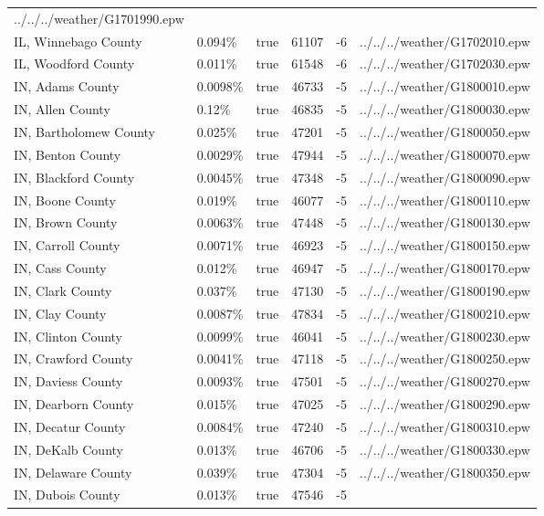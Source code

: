 \begin{longtable}[]{@{}llllll@{}}
../../../weather/G1701990.epw \\
IL, Winnebago County & 0.094\% & true & 61107 & -6 &
../../../weather/G1702010.epw \\
IL, Woodford County & 0.011\% & true & 61548 & -6 &
../../../weather/G1702030.epw \\
IN, Adams County & 0.0098\% & true & 46733 & -5 &
../../../weather/G1800010.epw \\
IN, Allen County & 0.12\% & true & 46835 & -5 &
../../../weather/G1800030.epw \\
IN, Bartholomew County & 0.025\% & true & 47201 & -5 &
../../../weather/G1800050.epw \\
IN, Benton County & 0.0029\% & true & 47944 & -5 &
../../../weather/G1800070.epw \\
IN, Blackford County & 0.0045\% & true & 47348 & -5 &
../../../weather/G1800090.epw \\
IN, Boone County & 0.019\% & true & 46077 & -5 &
../../../weather/G1800110.epw \\
IN, Brown County & 0.0063\% & true & 47448 & -5 &
../../../weather/G1800130.epw \\
IN, Carroll County & 0.0071\% & true & 46923 & -5 &
../../../weather/G1800150.epw \\
IN, Cass County & 0.012\% & true & 46947 & -5 &
../../../weather/G1800170.epw \\
IN, Clark County & 0.037\% & true & 47130 & -5 &
../../../weather/G1800190.epw \\
IN, Clay County & 0.0087\% & true & 47834 & -5 &
../../../weather/G1800210.epw \\
IN, Clinton County & 0.0099\% & true & 46041 & -5 &
../../../weather/G1800230.epw \\
IN, Crawford County & 0.0041\% & true & 47118 & -5 &
../../../weather/G1800250.epw \\
IN, Daviess County & 0.0093\% & true & 47501 & -5 &
../../../weather/G1800270.epw \\
IN, Dearborn County & 0.015\% & true & 47025 & -5 &
../../../weather/G1800290.epw \\
IN, Decatur County & 0.0084\% & true & 47240 & -5 &
../../../weather/G1800310.epw \\
IN, DeKalb County & 0.013\% & true & 46706 & -5 &
../../../weather/G1800330.epw \\
IN, Delaware County & 0.039\% & true & 47304 & -5 &
../../../weather/G1800350.epw \\
IN, Dubois County & 0.013\% & true & 47546 & -5 &

\end{longtable}
